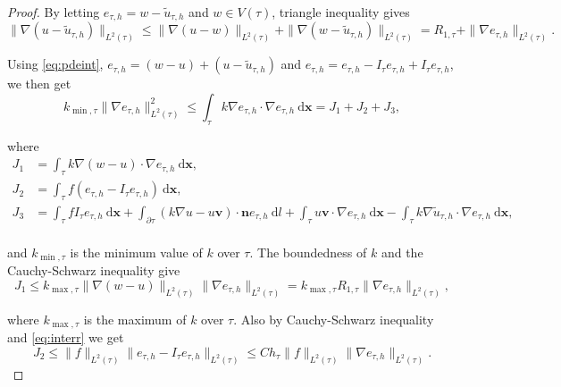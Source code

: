 \documentclass[times]{nlaauth}
\numberwithin{equation}{section}
\begin{document}
\begin{proof}
By letting $e_{\tau, h} = w - \widetilde u_{\tau, h}$
and $w \in V(\tau)$, triangle inequality gives
\begin{equation} \label{eq:p0}
\| \nabla( u - \widetilde u_{\tau, h} ) \|_{L^2(\tau)} \leq \| \nabla( u - w ) \|_{L^2(\tau)} + \| \nabla( w - \widetilde u_{\tau, h} ) \|_{L^2(\tau)} =
R_{1,\tau} + \| \nabla e_{\tau,h} \|_{L^2(\tau)}. 
\end{equation}

\noindent
Using \eqref{eq:pdeint}, $e_{\tau, h} = (w - u) + (u - \widetilde u_{\tau, h})$ and $e_{\tau, h} = e_{\tau, h} - I_\tau e_{\tau, h} + I_\tau e_{\tau, h}$, we then get
\begin{equation} \label{eq:p1}
k_{\min, \tau} \| \nabla e_{\tau, h} \|^2_{L^2(\tau)} \leq \int_\tau k \nabla e_{\tau, h} \cdot \nabla e_{\tau, h} \ \text{d} \boldsymbol{x} = J_1 + J_2 + J_3,
\end{equation}

\noindent
where
\begin{equation*}
\begin{aligned}
J_1 & = \int_\tau k \nabla (w-u) \cdot \nabla e_{\tau, h} \ \text{d} \boldsymbol{x}, \\
J_2 & = \int_\tau f ( e_{\tau, h} - I_\tau e_{\tau, h} ) \ \text{d} \boldsymbol{x}, \\
J_3 & = \int_\tau f I_\tau e_{\tau, h} \ \text{d} \boldsymbol{x} + \int_{\partial\tau} ( k\nabla u - u\boldsymbol{v})  \cdot \boldsymbol{n} e_{\tau, h} \ \text{d} l + \int_\tau  u\boldsymbol{v} \cdot \nabla e_{\tau, h} \ \text{d} \boldsymbol{x} - \int_\tau k \nabla \widetilde u_{\tau, h}  \cdot \nabla e_{\tau, h} \ \text{d} \boldsymbol{x},\\
\end{aligned}
\end{equation*}

\noindent
and $k_{\min, \tau}$ is the minimum value of $k$ over $\tau$. The boundedness of $k$ and the Cauchy-Schwarz inequality give
\begin{equation} \label{eq:pJ1}
J_1 \leq k_{\max, \tau} \| \nabla (w-u) \|_{L^2(\tau)}  \| \nabla e_{\tau, h} \|_{L^2(\tau)}
= k_{\max, \tau} R_{1,\tau} \| \nabla e_{\tau, h} \|_{L^2(\tau)},
\end{equation}

\noindent
where $k_{\max, \tau}$ is the maximum of $k$ over $\tau$. Also by Cauchy-Schwarz inequality and \eqref{eq:interr} we get
\begin{equation} \label{eq:pJ2}
J_2 \leq \| f \|_{L^2(\tau)} \| e_{\tau, h} - I_\tau e_{\tau, h} \|_{L^2(\tau)}  \leq Ch_\tau \| f \|_{L^2(\tau)} \| \nabla e_{\tau, h} \|_{L^2(\tau)}.
\end{equation}


\end{proof}
\end{document}
